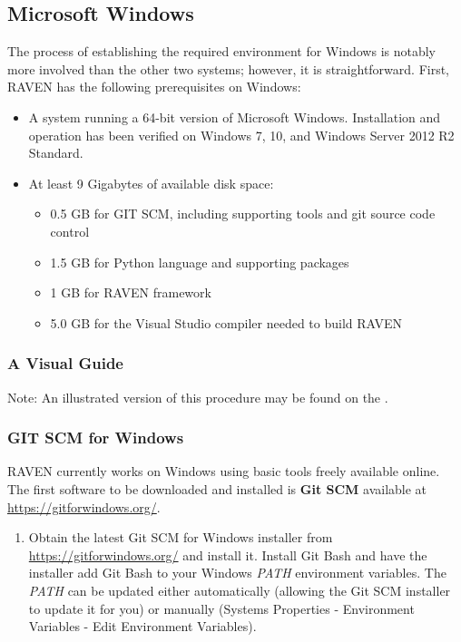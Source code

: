 \subsection{Microsoft Windows}
\label{sec:install windows}

The process of establishing the required environment for Windows is notably more involved than the other two
systems; however, it is straightforward.  First, RAVEN has the following prerequisites on Windows:

\begin{itemize}
    \item A system running a 64-bit version of Microsoft Windows. Installation and operation
        has been verified on Windows 7, 10, and Windows Server 2012 R2 Standard.
    \item At least 9 Gigabytes of available disk space:
    \begin{itemize}
        \item 0.5 GB for GIT SCM, including supporting tools and git source code control
        \item 1.5 GB for Python language and supporting packages
        \item 1 GB for RAVEN framework
        \item 5.0 GB for the Visual Studio compiler needed to build RAVEN
    \end{itemize}
\end{itemize}

\subsubsection{A Visual Guide}
Note: An illustrated version of this procedure may be found on the \wiki.

\subsubsection{GIT SCM for Windows}
RAVEN currently works on Windows using basic tools freely available online. 
The first software to be downloaded and installed is \textbf{Git SCM} available at \url{https://gitforwindows.org/}.
\begin{enumerate}
    \item Obtain the latest Git SCM for Windows installer from  \url{https://gitforwindows.org/} and install it. 
    Install Git Bash and have 
    the installer add Git Bash to your Windows \textit{PATH} environment variables. 
    The \textit{PATH} can be updated either automatically (allowing the Git SCM installer to update it for you) or manually 
    (Systems Properties - Environment Variables - Edit Environment Variables).
\end{enumerate}

